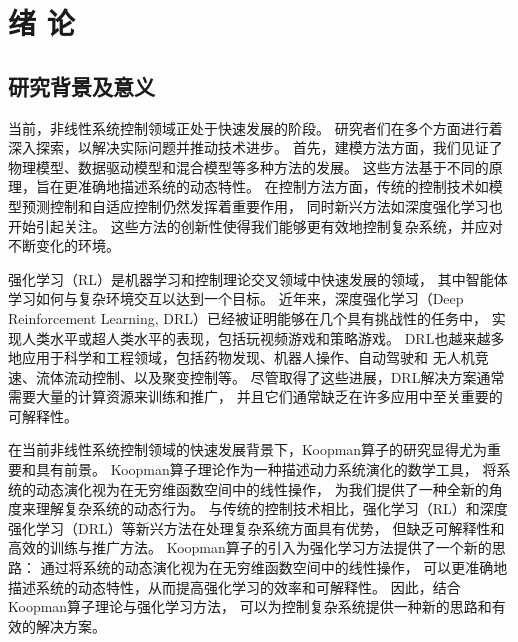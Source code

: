 \documentclass[AutoFakeBold]{LZUThesis}
\begin{document}


\mainmatter

\chapter{\texorpdfstring{绪 \quad 论}{绪论}}

\section{研究背景及意义}
当前，非线性系统控制领域正处于快速发展的阶段。
研究者们在多个方面进行着深入探索，以解决实际问题并推动技术进步。
首先，建模方法方面，我们见证了物理模型、数据驱动模型和混合模型等多种方法的发展。
这些方法基于不同的原理，旨在更准确地描述系统的动态特性。
在控制方法方面，传统的控制技术如模型预测控制和自适应控制仍然发挥着重要作用，
同时新兴方法如深度强化学习也开始引起关注。
这些方法的创新性使得我们能够更有效地控制复杂系统，并应对不断变化的环境。

强化学习（RL）是机器学习和控制理论交叉领域中快速发展的领域，
其中智能体学习如何与复杂环境交互以达到一个目标。
近年来，深度强化学习（Deep Reinforcement Learning, DRL）已经被证明能够在几个具有挑战性的任务中，
实现人类水平或超人类水平的表现，包括玩视频游戏和策略游戏。
DRL也越来越多地应用于科学和工程领域，包括药物发现、机器人操作、自动驾驶和
无人机竞速、流体流动控制、以及聚变控制等。
尽管取得了这些进展，DRL解决方案通常需要大量的计算资源来训练和推广，
并且它们通常缺乏在许多应用中至关重要的可解释性。

在当前非线性系统控制领域的快速发展背景下，Koopman算子的研究显得尤为重要和具有前景。
Koopman算子理论作为一种描述动力系统演化的数学工具，
将系统的动态演化视为在无穷维函数空间中的线性操作，
为我们提供了一种全新的角度来理解复杂系统的动态行为。
与传统的控制技术相比，强化学习（RL）和深度强化学习（DRL）等新兴方法在处理复杂系统方面具有优势，
但缺乏可解释性和高效的训练与推广方法。
Koopman算子的引入为强化学习方法提供了一个新的思路：
通过将系统的动态演化视为在无穷维函数空间中的线性操作，
可以更准确地描述系统的动态特性，从而提高强化学习的效率和可解释性。
因此，结合Koopman算子理论与强化学习方法，
可以为控制复杂系统提供一种新的思路和有效的解决方案。
\end{document}
